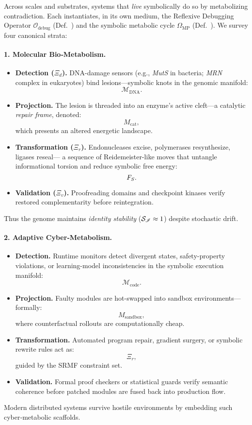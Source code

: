 \begin{scholium}
\label{scholium:bk8_autonomous_repair_systems_expanded}
Across scales and substrates, systems that \emph{live} symbolically do so by metabolizing contradiction.  Each instantiates, in its own medium, the Reflexive Debugging Operator $\mathcal{O}_{\text{debug}}$ (Def.~) and the symbolic metabolic cycle $\Omega_{\text{MP}}$ (Def.~).  We survey four canonical strata:
\paragraph{1. Molecular Bio‑Metabolism.}
\begin{itemize}
    \item \textbf{Detection (\( \Xi_d \)).} 
    DNA-damage sensors 
    (e.g., \emph{MutS} in bacteria; \emph{MRN} complex in eukaryotes) 
    bind lesions—symbolic knots in the genomic manifold:
    \[
    \mathcal{M}_{\mathrm{DNA}}.
    \]
    \item \textbf{Projection.} 
    The lesion is threaded into an enzyme’s active cleft—a catalytic \textit{repair frame},
    denoted:
    \[
    M_{\mathrm{cat}},
    \]
    which presents an altered energetic landscape.
    \item \textbf{Transformation (\( \Xi_r \)).} 
    Endonucleases excise, polymerases resynthesize, ligases reseal—
    a sequence of Reidemeister-like moves that untangle informational torsion 
    and reduce symbolic free energy:
    \[
    F_S.
    \]
    \item \textbf{Validation (\( \Xi_v \)).} 
    Proofreading domains and checkpoint kinases verify restored complementarity 
    before reintegration.
\end{itemize}
Thus the genome maintains \emph{identity stability} ($\mathcal{S}_{\mathscr{I}} \approx 1$) despite stochastic drift.
\paragraph{2. Adaptive Cyber‑Metabolism.}
\begin{itemize}
    \item \textbf{Detection.} 
    Runtime monitors detect divergent states, safety-property violations, 
    or learning-model inconsistencies in the symbolic execution manifold:
    \[
    \mathcal{M}_{\mathrm{code}}.
    \]
    \item \textbf{Projection.} 
    Faulty modules are hot-swapped into sandbox environments—formally:
    \[
    M_{\mathrm{sandbox}},
    \]
    where counterfactual rollouts are computationally cheap.
    \item \textbf{Transformation.} 
    Automated program repair, gradient surgery, or symbolic rewrite rules act as:
    \[
    \Xi_r,
    \]
    guided by the SRMF constraint set.
    \item \textbf{Validation.} 
    Formal proof checkers or statistical guards verify semantic coherence 
    before patched modules are fused back into production flow.
\end{itemize}
Modern distributed systems survive  hostile environments by embedding such cyber‑metabolic scaffolds.

\end{scholium}
